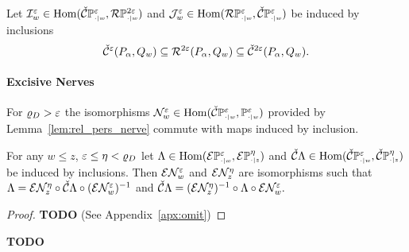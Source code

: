 Let $\I_w^\e\in\Hom(\CPP{w}{\e}, \RPP{w}{2\e})$ and $\J_w^\e\in\Hom(\RPP{w}{\e},\CPP{w}{\e})$ be induced by inclusions
\[ \cech^\e(P_\alpha, Q_w)\subseteq \rips^{2\e}(P_\alpha,Q_w)\subseteq \cech^{2\e}(P_\alpha, Q_w).\]

\paragraph{Excisive Nerves}

For $\varrho_D > \e$ the isomorphisms $\N_w^\e\in\Hom(\CPP{w}{\e}, \PP{w}{\e})$ provided by Lemma~\ref{lem:rel_pers_nerve} commute with maps induced by inclusion.

\begin{lemma}\label{cor:excisive_nerve}
  For any $w\leq z$, $\e\leq \eta < \varrho_D$ let $\Lambda\in\Hom(\E\PP{w}{\e},\E\PP{z}{\eta})$ and $\cech\Lambda\in\Hom(\CPP{w}{\e},\CPP{z}{\eta})$ be induced by inclusions.
  Then $\E\N_w^\e$ and $\E\N_z^\eta$ are isomorphisms such that $\Lambda = \E\N_{z}^{\eta}\circ \cech\Lambda\circ (\E\N_w^\e)^{-1}$ and $\cech\Lambda = (\E\N_{z}^{\eta})^{-1}\circ \Lambda\circ \E\N_w^\e.$
\end{lemma}
\begin{proof}\textbf{TODO}
  (See Appendix~\ref{apx:omit})
\end{proof}
\proofatend
  \textbf{TODO}
\endproofatend
